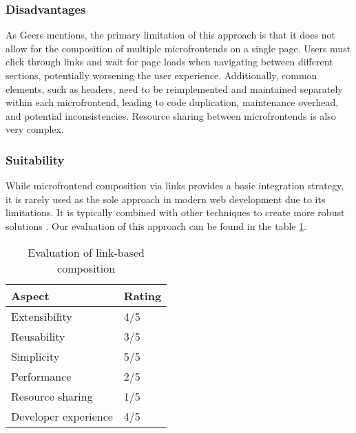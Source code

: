\subsubsection{Disadvantages}
As Geers \cite{Geers} mentions, the primary limitation of this approach is that it does not allow for the composition of multiple microfrontends on a single page. Users must click through links and wait for page loads when navigating between different sections, potentially worsening the user experience. Additionally, common elements, such as headers, need to be reimplemented and maintained separately within each microfrontend, leading to code duplication, maintenance overhead, and potential inconsistencies. Resource sharing between microfrontends is also very complex. 

\subsubsection{Suitability}
While microfrontend composition via links provides a basic integration strategy, it is rarely used as the sole approach in modern web development due to its limitations. It is typically combined with other techniques to create more robust solutions \cite{Geers}. Our evaluation of this approach can be found in the table \ref{table:link-evaluation}.
\begin{table}[h]
  \centering
  \begin{tabular}{|l|l|}
    \hline
      \textbf{Aspect} & \textbf{Rating} \\
    \hline
      Extensibility & 4/5 \\
    \hline
      Reusability & 3/5 \\
    \hline
      Simplicity & 5/5 \\
    \hline
      Performance & 2/5 \\
    \hline
      Resource sharing & 1/5 \\
    \hline
      Developer experience & 4/5 \\
    \hline
  \end{tabular}
  \caption{Evaluation of link-based composition}
  \label{table:link-evaluation}
\end{table}


